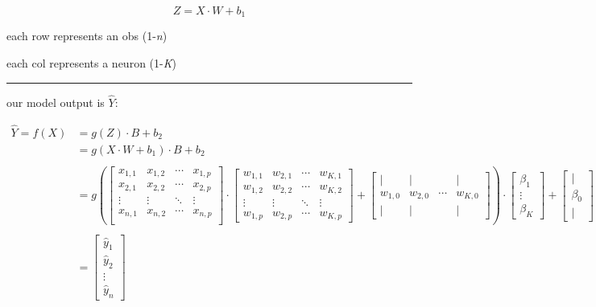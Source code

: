 \documentclass[
]{book}
\begin{document}
\[Z = X \cdot W + b_1\]

each row represents an obs (1-\emph{n})

each col represents a neuron (1-\emph{K})

\begin{center}\rule{0.5\linewidth}{0.5pt}\end{center}

our model output is \(\hat Y\):

\[
\begin{aligned}
\hat Y = f(X) &= g(Z) \cdot B + b_2 \\
&= g(X \cdot W + b_1) \cdot B + b_2 \\ \\
&= g\left(\begin{bmatrix}
x_{1, 1} & x_{1, 2} & \cdots & x_{1, p} \\
x_{2, 1} & x_{2, 2} & \cdots & x_{2, p} \\
\vdots & \vdots & \ddots & \vdots \\
x_{n, 1} & x_{n, 2} & \cdots & x_{n, p} \\
\end{bmatrix} \cdot \begin{bmatrix}
w_{1, 1} & w_{2, 1} & \cdots & w_{K, 1} \\
w_{1, 2} & w_{2, 2} & \cdots & w_{K, 2} \\
\vdots & \vdots & \ddots & \vdots \\
w_{1, p} & w_{2, p} & \cdots & w_{K, p}
\end{bmatrix} + \begin{bmatrix}
| & | &  & | \\
w_{1, 0} & w_{2, 0} & \cdots & w_{K, 0} \\
| & | &  & |
\end{bmatrix}\right) \cdot \begin{bmatrix}
\beta_{1} \\
\vdots \\
\beta_{K}
\end{bmatrix} + \begin{bmatrix} | \\ \beta_0 \\ | \end{bmatrix} \\ \\
&= \begin{bmatrix}
\hat y_1 \\
\hat y_2 \\
\vdots \\
\hat y_n
\end{bmatrix}
\end{aligned}
\]
\end{document}
